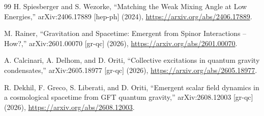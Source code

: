 \documentclass[aps,prd,reprint,nofootinbib,floatfix]{revtex4-2}
\begin{document}
\begin{thebibliography}{99}
H. Spiesberger and S. Wezorke,
``Matching the Weak Mixing Angle at Low Energies,''
arXiv:2406.17889 [hep-ph] (2024),
\url{https://arxiv.org/abs/2406.17889}.

M. Rainer,
``Gravitation and Spacetime: Emergent from Spinor Interactions -- How?,''
arXiv:2601.00070 [gr-qc] (2026),
\url{https://arxiv.org/abs/2601.00070}.

A. Calcinari, A. Delhom, and D. Oriti,
``Collective excitations in quantum gravity condensates,''
arXiv:2605.18977 [gr-qc] (2026),
\url{https://arxiv.org/abs/2605.18977}.

R. Dekhil, F. Greco, S. Liberati, and D. Oriti,
``Emergent scalar field dynamics in a cosmological spacetime from GFT quantum gravity,''
arXiv:2608.12003 [gr-qc] (2026),
\url{https://arxiv.org/abs/2608.12003}.

\end{thebibliography}
\end{document}
